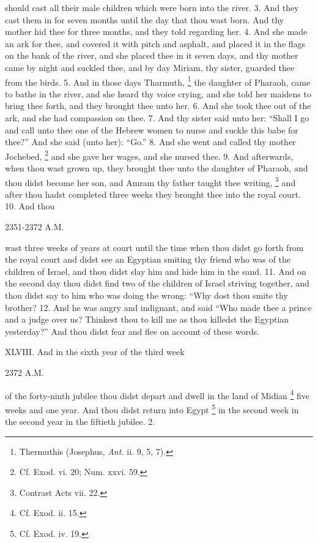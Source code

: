 should cast all their male children which were born into the river. 3. And they cast them in for seven months until the day that thou wast born. And thy mother hid thee for three months, and they told regarding her. 4. And she made an ark for thee, and covered it with pitch and asphalt, and placed it in the flags on the bank of the river, and she placed thee in it seven days, and thy mother came by night and suckled thee, and by day Miriam, thy sister, guarded thee from the birds. 5. And in those days Tharmuth, \footnote{Thermuthis (Josephus, \emph{Ant.} ii. 9, 5, 7).} the daughter of Pharaoh, came to bathe in the river, and she heard thy voice crying, and she told her maidens to bring thee forth, and they brought thee unto her. 6. And she took thee out of the ark, and she had compassion on thee. 7. And thy sister said unto her: ``Shall I go and call unto thee one of the Hebrew women to nurse and suckle this babe for thee?'' And she said (unto her): ``Go.'' 8. And she went and called thy mother Jochebed, \footnote{Cf. Exod. vi. 20; Num. xxvi. 59.} and she gave her wages, and she nursed thee. 9. And afterwards, when thou wast grown up, they brought thee unto the daughter of Pharaoh, and thou didst become her son, and Amram thy father taught thee writing, \footnote{Contrast Acts vii. 22.} and after thou hadst completed three weeks they brought thee into the royal court. 10. And thou

2351-2372 A.M.

wast three weeks of years at court until the time when thou didst go forth from the royal court and didst see an Egyptian smiting thy friend who was of the children of Israel, and thou didst slay him and hide him in the sand. 11. And on the second day thou didst find two of the children of Israel striving together, and thou didst say to him who was doing the wrong: ``Why dost thou smite thy brother? 12. And he was angry and indignant, and said ``Who made thee a prince and a judge over us? Thinkest thou to kill me as thou killedst the Egyptian yesterday?'' And thou didst fear and flee on account of these words.


XLVIII. And in the sixth year of the third week

2372 A.M.

of the forty-ninth jubilee thou didst depart and dwell in the land of Midian \footnote{Cf. Exod. ii. 15.} five weeks and one year. And thou didst return into Egypt \footnote{Cf. Exod. iv. 19.} in the second week in the second year in the fiftieth jubilee. 2.

